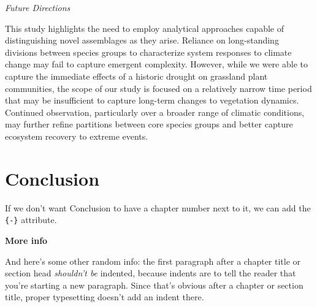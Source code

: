 \documentclass[twoside,12pt,final]{ucthesis-CA2012}
\begin{document}
\begin{ucmainmatter}
\emph{Future Directions}

This study highlights the need to employ analytical approaches capable of distinguishing novel assemblages as they arise.
Reliance on long-standing divisions between species groups to characterize system responses to climate change may fail to capture emergent complexity.
However, while we were able to capture the immediate effects of a historic drought on grassland plant communities, the scope of our study is focused on a relatively narrow time period that may be insufficient to capture long-term changes to vegetation dynamics.
Continued observation, particularly over a broader range of climatic conditions, may further refine partitions between core species groups and better capture ecosystem recovery to extreme events.

\hypertarget{conclusion}{%
\chapter*{Conclusion}\label{conclusion}}

If we don't want Conclusion to have a chapter number next to it, we can add the \texttt{\{-\}} attribute.

\textbf{More info}

And here's some other random info: the first paragraph after a chapter title or section head \emph{shouldn't be} indented, because indents are to tell the reader that you're starting a new paragraph. Since that's obvious after a chapter or section title, proper typesetting doesn't add an indent there.

\appendix

\hypertarget{chapter-1-supporting-information}{%
}
\end{ucmainmatter}
\end{document}
